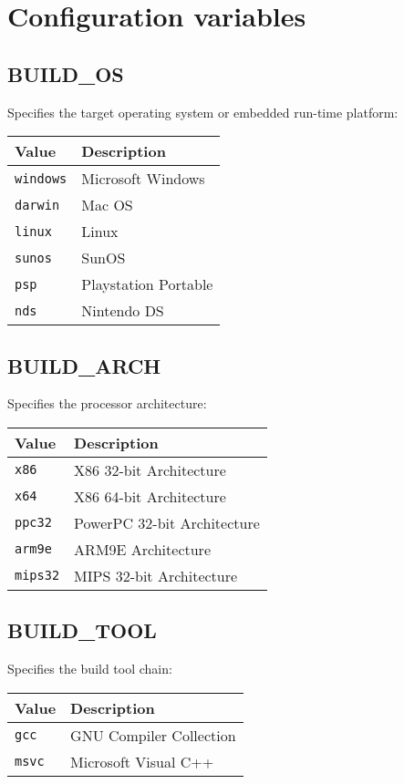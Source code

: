 \documentclass{article}
\newcommand{\val}[1]{{\tt #1}}
\begin{document}
\section{Configuration variables}
  
\subsection{BUILD\_OS}

Specifies the target operating system or embedded run-time platform:

\begin{tabular}{ll}
Value         & Description           \\
\hline
\val{windows} & Microsoft Windows     \\
\val{darwin}  & Mac OS                \\
\val{linux}   & Linux                 \\
\val{sunos}   & SunOS                 \\
\val{psp}     & Playstation Portable  \\
\val{nds}     & Nintendo DS           \\
\end{tabular}

\subsection{BUILD\_ARCH}

Specifies the  processor architecture:

\begin{tabular}{ll}
Value        & Description                 \\
\hline
\val{x86}    & X86 32-bit Architecture     \\
\val{x64}    & X86 64-bit Architecture     \\
\val{ppc32}  & PowerPC 32-bit Architecture \\
\val{arm9e}  & ARM9E Architecture          \\
\val{mips32} & MIPS 32-bit Architecture    \\
\end{tabular}

\subsection{BUILD\_TOOL}

Specifies the build tool chain:

\begin{tabular}{ll}
Value      & Description             \\
\hline
\val{gcc}  & GNU Compiler Collection \\
\val{msvc} & Microsoft Visual C++    \\
\end{tabular}
\end{document}
